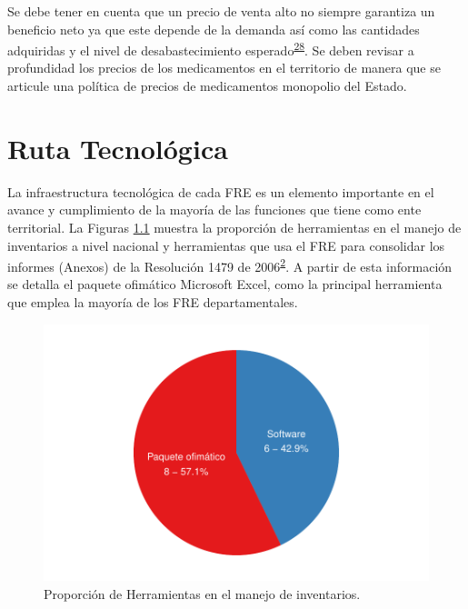 \documentclass[
]{book}
\begin{document}
Se debe tener en cuenta que un precio de venta alto no siempre garantiza un beneficio neto ya que este depende de la demanda así como las cantidades adquiridas y el nivel de desabastecimiento esperado\textsuperscript{\protect\hyperlink{ref-Silver2017}{28}}. Se deben revisar a profundidad los precios de los medicamentos en el territorio de manera que se articule una política de precios de medicamentos monopolio del Estado.

\hypertarget{ruta-tecnoluxf3gica}{%
\chapter{Ruta Tecnológica}\label{ruta-tecnoluxf3gica}}


La infraestructura tecnológica de cada FRE es un elemento importante en el avance y cumplimiento de la mayoría de las funciones que tiene como ente territorial. La Figuras \ref{fig:PropHerramientasManejoInventarios} muestra la proporción de herramientas en el manejo de inventarios a nivel nacional y herramientas que usa el FRE para consolidar los informes (Anexos) de la Resolución 1479 de 2006\textsuperscript{\protect\hyperlink{ref-MSPS1479-2006}{2}}. A partir de esta información se detalla el paquete ofimático Microsoft Excel, como la principal herramienta que emplea la mayoría de los FRE departamentales.

\begin{figure}

{\centering \includegraphics[width=0.85\linewidth]{InformeFinal_files/figure-latex/PropHerramientasManejoInventarios-1} 

}

\caption{Proporción de Herramientas en el manejo de inventarios.}\label{fig:PropHerramientasManejoInventarios}
\end{figure}
\end{document}
